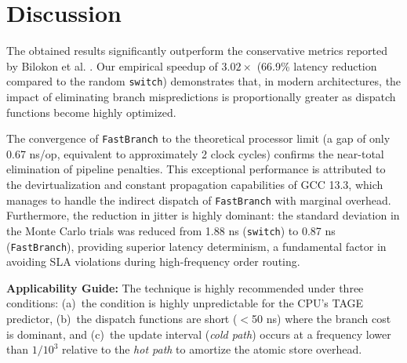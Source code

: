 \section{Discussion}

The obtained results significantly outperform the conservative metrics reported by Bilokon et al. \cite{bilokon2025}. Our empirical speedup of $3.02\times$ (66.9\% latency reduction compared to the random \texttt{switch}) demonstrates that, in modern architectures, the impact of eliminating branch mispredictions is proportionally greater as dispatch functions become highly optimized.

The convergence of \texttt{FastBranch} to the theoretical processor limit (a gap of only 0.67 ns/op, equivalent to approximately 2 clock cycles) confirms the near-total elimination of pipeline penalties. This exceptional performance is attributed to the devirtualization and constant propagation capabilities of GCC 13.3, which manages to handle the indirect dispatch of \texttt{FastBranch} with marginal overhead. Furthermore, the reduction in jitter is highly dominant: the standard deviation in the Monte Carlo trials was reduced from 1.88 ns (\texttt{switch}) to 0.87 ns (\texttt{FastBranch}), providing superior latency determinism, a fundamental factor in avoiding SLA violations during high-frequency order routing.

\textbf{Applicability Guide:} The technique is highly recommended under three conditions: (a)~the condition is highly unpredictable for the CPU's TAGE predictor, (b)~the dispatch functions are short ($<$50 ns) where the branch cost is dominant, and (c)~the update interval (\textit{cold path}) occurs at a frequency lower than $1/10^3$ relative to the \textit{hot path} to amortize the atomic store overhead.
